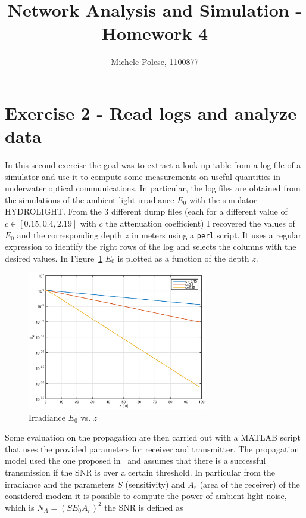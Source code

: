 \documentclass[10pt]{article}
\begin{document}
\title{Network Analysis and Simulation - Homework 4}
\author{Michele Polese, 1100877}

\maketitle

\section*{Exercise 2 - Read logs and analyze data}
In this second exercise the goal was to extract a look-up table from a log file of a simulator and use it to compute some measurements on useful quantities in underwater optical communications. In particular, the log files are obtained from the simulations of the ambient light irradiance $E_0$ with the simulator HYDROLIGHT. From the 3 different dump files (each for a different value of $c \in [0.15, 0.4, 2.19]$ with $c$ the attenuation coefficient) I recovered the values of $E_0$ and the corresponding depth $z$ in meters using a \texttt{perl} script. It uses a regular expression to identify the right rows of the log and selects the columns with the desired values. In Figure~\ref{fig:e0zm} $E_0$ is plotted as a function of the depth $z$.

\begin{figure}[h!]
	\centering
	\includegraphics[width = 0.7\textwidth]{e0_z}
	\caption{Irradiance $E_0$ vs. $z$}
	\label{fig:e0zm}
\end{figure}

Some evaluation on the propagation are then carried out with a MATLAB script that uses the provided parameters for receiver and transmitter. The propagation model used the one proposed in~\cite{optmodel} and assumes that there is a successful transmission if the SNR is over a certain threshold. In particular from the irradiance and the parameters $S$ (sensitivity) and $A_r$ (area of the receiver) of the considered modem it is possible to compute the power of ambient light noise, which is $N_A = (S E_0 A_r)^2$ the SNR is defined as
\begin{equation}
	
\end{equation}
\end{document}
